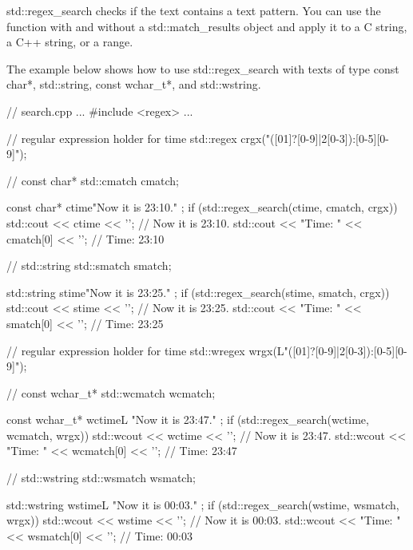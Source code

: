 
std::regex\_search checks if the text contains a text pattern. You can use the function with and without a std::match\_results object and apply it to a C string, a C++ string, or a range.

The example below shows how to use std::regex\_search with texts of type const char*, std::string, const wchar\_t*, and std::wstring.


\begin{cpp}
// search.cpp
...
#include <regex>
...

// regular expression holder for time
std::regex crgx("([01]?[0-9]|2[0-3]):[0-5][0-9]");

// const char*
std::cmatch cmatch;

const char* ctime{"Now it is 23:10." };
if (std::regex_search(ctime, cmatch, crgx)){
	std::cout << ctime << '\n'; // Now it is 23:10.
	std::cout << "Time: " << cmatch[0] << '\n'; // Time: 23:10
}

// std::string
std::smatch smatch;

std::string stime{"Now it is 23:25." };
if (std::regex_search(stime, smatch, crgx)){
	std::cout << stime << '\n'; // Now it is 23:25.
	std::cout << "Time: " << smatch[0] << '\n'; // Time: 23:25
}

// regular expression holder for time
std::wregex wrgx(L"([01]?[0-9]|2[0-3]):[0-5][0-9]");

// const wchar_t*
std::wcmatch wcmatch;

const wchar_t* wctime{L "Now it is 23:47." };
if (std::regex_search(wctime, wcmatch, wrgx)){
	std::wcout << wctime << '\n'; // Now it is 23:47.
	std::wcout << "Time: " << wcmatch[0] << '\n'; // Time: 23:47
}

// std::wstring
std::wsmatch wsmatch;

std::wstring wstime{L "Now it is 00:03." };
if (std::regex_search(wstime, wsmatch, wrgx)){
	std::wcout << wstime << '\n'; // Now it is 00:03.
	std::wcout << "Time: " << wsmatch[0] << '\n'; // Time: 00:03
}
\end{cpp}






































